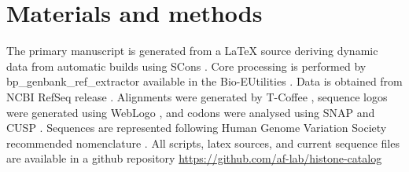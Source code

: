 \section{Materials and methods}
\label{sec:matmethods}

  The primary manuscript is generated from a \LaTeX{} source
  deriving dynamic data from automatic builds using SCons  \citep{SCons2005}.
  Core processing is performed by bp\_genbank\_ref\_extractor
  available in the Bio-EUtilities  \citep{bioperl}.
  Data is obtained from NCBI RefSeq release  \citep{PruittRefseq2014}.
  Alignments were generated by T-Coffee   \citep{tcoffee2000},
  sequence logos were generated using WebLogo   \citep{weblogo},
  and codons were analysed using SNAP  \citep{KorberSNAP2000}
  and CUSP  \citep{Emboss2000}.
  Sequences are represented following Human Genome Variation Society recommended nomenclature \citep{mutnomenclature2003}.
  All scripts, latex sources, and current sequence files
  are available in a github repository \url{https://github.com/af-lab/histone-catalog}
